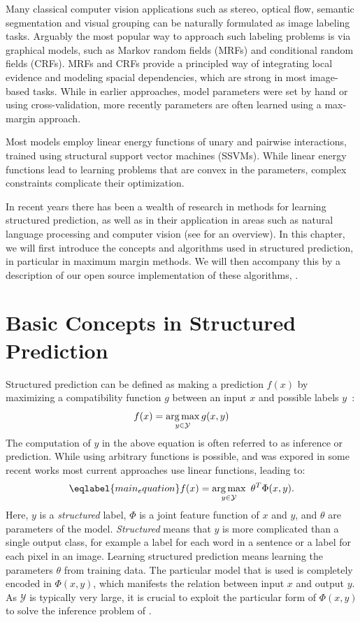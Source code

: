 Many classical computer vision applications such as stereo, optical flow, semantic
segmentation and visual grouping can be naturally formulated as image labeling tasks.
%
Arguably the most popular way to approach such labeling problems is via graphical
models, such as Markov random fields (MRFs) and conditional random fields (CRFs).
MRFs and CRFs provide a principled way of integrating local evidence and
modeling spacial dependencies, which are strong in most image-based tasks.
%
While in earlier approaches, model parameters were set by hand or using
cross-validation, more recently parameters are often learned using a max-margin
approach.

Most models employ linear energy functions of unary and pairwise interactions,
trained using structural support vector machines (SSVMs). While linear energy
functions lead to learning problems that are convex in the parameters, complex
constraints complicate their optimization. 

In recent years there has been a wealth of research in methods for learning
structured prediction, as well as in their application in areas such as natural
language processing and computer vision (see \citet{nowozin2011structured} for
an overview).
%
In this chapter, we will first introduce the concepts and algorithms used in
structured prediction, in particular in maximum margin methods. We will then
accompany this by a description of our open source implementation of these
algorithms, \pystruct.

\section{Basic Concepts in Structured Prediction}

Structured prediction can be defined as making a prediction $f(x)$ by maximizing a
compatibility function $g$ between an input $x$ and possible labels
$y$~\citep{nowozin2011structured}:
\begin{equation}
    f(x) = \operatorname*{arg\,max}_{y \in \mathcal{Y}} g(x, y)
\end{equation}
The computation of $y$ in the above equation is often referred to as inference
or prediction.
While using arbitrary functions is possible, and was expored
in some recent works %
most current approaches use linear functions, leading to:
\begin{equation}\eqlabel{main_equation}
    f(x) = \argmax_{y \in \mathcal{Y}}\  \theta^T \Phi(x, y).
\end{equation}
Here, $y$ is a \emph{structured} label, $\Phi$ is a joint feature function of
$x$ and $y$, and $\theta$ are parameters of the model. \emph{Structured} means
that $y$ is more complicated than a single output class, for example a label
for each word in a sentence or a label for each pixel in an image.
Learning structured prediction means learning the parameters $\theta$ from training data.
The particular model that is used is completely encoded in $\Phi(x, y)$, which manifests
the relation between input $x$ and output $y$. As $\mathcal{Y}$ is typically very large,
it is crucial to exploit the particular form of $\Phi(x, y)$ to solve the inference problem
of .


